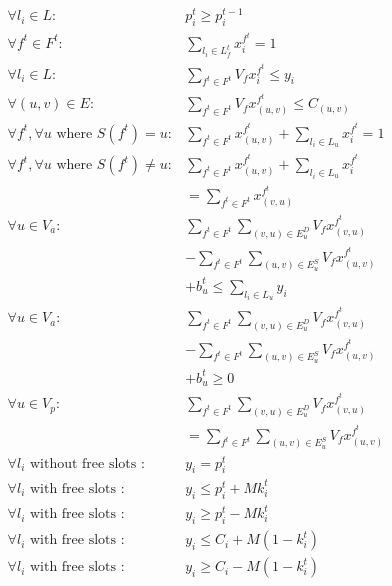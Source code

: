 \begin{algorithm}
\begin{algorithmic}
		\renewcommand{\algorithmicensure}{ \textbf{Subject to:}}
		\ENSURE
            $$\begin{array}{ll}
            \forall l_i \in L : &p_i^t \geq p_i^{t-1} \\
            \forall f^{t} \in F^{t} : &\sum_{l_i \in L_f^{t}} x_i^{f^{t}}=1 \\
            \forall l_i \in L : &\sum_{f^{t} \in F^{t}} V_f x_i^{f^{t}} \leq y_i \\
            \forall(u, v) \in E  : &\sum_{f^{t} \in F^{t}} V_f x_{(u, v)}^{f^{t}} \leq C_{(u, v)} \\
            \forall f^{t}, \forall u \text { where } S(f^{t})=u : &\sum_{f^{t} \in F^{t}} x_{(u, v)}^{f^{t}}+\sum_{l_i \in L_u} x_i^{f^{t}}=1 \\
            \forall f^{t}, \forall u \text { where } S(f^{t}) \neq u  : &\sum_{f^{t} \in F^{t}} x_{(u, v)}^{f^{t}}+\sum_{l_i \in L_u} x_i^{f^{t}} \\& =\sum_{f^{t} \in F^{t}} x_{(v, u)}^{f^{t}} \\
            \forall u \in V_a : &\sum_{f^{t} \in F^{t}} \sum_{(v, u) \in E_u^D} V_f x_{(v, u)}^{f^{t}} \\&-\sum_{f^{t} \in F^{t}} \sum_{(u, v) \in E_u^S} V_f x_{(u, v)}^{f^{t}} \\& +b_u^t \leq \sum_{l_i \in L_u} y_i \\
            \forall u \in V_a : &\sum_{f^{t} \in F^{t}} \sum_{(v, u) \in E_u^D} V_f x_{(v, u)}^{f^{t}} \\&-\sum_{f^{t} \in F^{t}} \sum_{(u, v) \in E_u^S} V_f x_{(u, v)}^{f^{t}} \\& +b_u^t \geq 0 \\
            \forall u \in V_p : &\sum_{f^{t} \in F^{t}} \sum_{(v, u) \in E_u^D} V_f x_{(v, u)}^{f^{t}} \\& =\sum_{f^{t} \in F^{t}} \sum_{(u, v) \in E_u^S} V_f x_{(u, v)}^{f^{t}} \\
            \forall l_i \text { without free slots } : &y_i=p_i^t \\
            \forall l_i \text { with free slots } : &y_i \leq p_i^t+M k_i^t \\
            \forall l_i \text { with free slots } : &y_i \geq p_i^t-M k_i^t \\
            \forall l_i \text { with free slots } : &y_i \leq C_i+M\left(1-k_i^t\right) \\
            \forall l_i \text { with free slots } : &y_i \geq C_i-M\left(1-k_i^t\right) \\
            \end{array}$$
	\end{algorithmic}
\end{algorithm}



